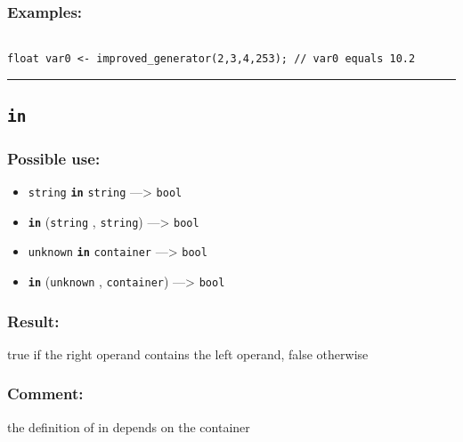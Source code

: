 \documentclass[]{book}
\providecommand{\tightlist}{%
  \setlength{\itemsep}{0pt}\setlength{\parskip}{0pt}}
\theoremstyle{definition}
\theoremstyle{definition}
\theoremstyle{definition}
\theoremstyle{remark}
\begin{document}
\subsubsection{Examples:}\label{examples-203}

\begin{verbatim}
 
float var0 <- improved_generator(2,3,4,253); // var0 equals 10.2
\end{verbatim}

\begin{center}\rule{0.5\linewidth}{\linethickness}\end{center}

\subsection{\texorpdfstring{\texttt{in}}{in}}\label{in}

\subsubsection{Possible use:}\label{possible-use-266}

\begin{itemize}
\tightlist
\item
  \texttt{string} \textbf{\texttt{in}} \texttt{string} ---\textgreater{}
  \texttt{bool}
\item
  \textbf{\texttt{in}} (\texttt{string} , \texttt{string})
  ---\textgreater{} \texttt{bool}
\item
  \texttt{unknown} \textbf{\texttt{in}} \texttt{container}
  ---\textgreater{} \texttt{bool}
\item
  \textbf{\texttt{in}} (\texttt{unknown} , \texttt{container})
  ---\textgreater{} \texttt{bool}
\end{itemize}

\subsubsection{Result:}\label{result-256}

true if the right operand contains the left operand, false otherwise

\subsubsection{Comment:}\label{comment-51}

the definition of in depends on the container
\end{document}
